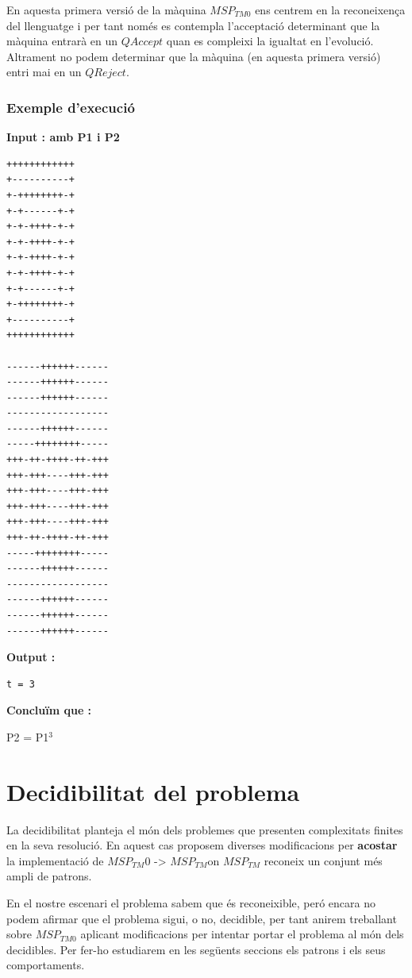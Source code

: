 \documentclass[12pt,a4paper]{report}
\def \tm{$MSP_{TM} $}
\def \tmz{$MSP_{TM0} $}
\begin{document}
En aquesta primera versió de la màquina \tmz{} ens centrem en la reconeixença del llenguatge i per tant només es contempla l’acceptació determinant que la màquina entrarà en un $QAccept$ quan es compleixi la igualtat en l’evolució. Altrament no podem determinar que la màquina (en aquesta primera versió) entri mai en un $QReject$.

\subsubsection{Exemple d'execució}

\textbf{Input : amb P1 i P2}

\begin{lstlisting}
++++++++++++
+----------+
+-++++++++-+
+-+------+-+
+-+-++++-+-+
+-+-++++-+-+
+-+-++++-+-+
+-+-++++-+-+
+-+------+-+
+-++++++++-+
+----------+
++++++++++++

------++++++------
------++++++------
------++++++------
------------------
------++++++------
-----++++++++-----
+++-++-++++-++-+++
+++-+++----+++-+++
+++-+++----+++-+++
+++-+++----+++-+++
+++-+++----+++-+++
+++-++-++++-++-+++
-----++++++++-----
------++++++------
------------------
------++++++------
------++++++------
------++++++------

\end{lstlisting}

\textbf{Output :}

\begin{lstlisting}
t = 3
\end{lstlisting}

\textbf{Concluïm que :}

P2 = P1$^3$


\section{Decidibilitat del problema}

La decidibilitat planteja el món dels problemes que presenten complexitats finites en la seva resolució. En aquest cas proposem diverses modificacions per \textbf{acostar} la implementació de \tm0{} -> \tm on \tm{} reconeix un conjunt més ampli de patrons. 

En el nostre escenari el problema sabem que és reconeixible, peró encara no podem afirmar que el problema sigui, o no, decidible, per tant anirem treballant sobre \tmz{} aplicant modificacions per intentar portar el problema al món dels decidibles. Per fer-ho estudiarem en les següents seccions els patrons i els seus comportaments. 
\end{document}
